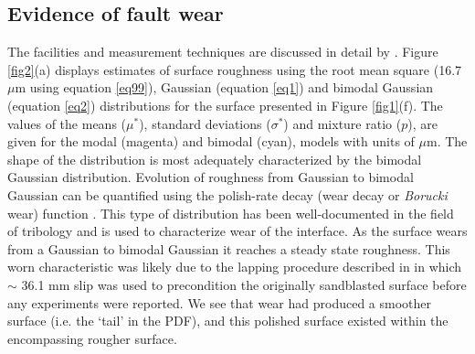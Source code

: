 \documentclass[preprint,1p, 10pt,authoryear]{elsarticle}
\begin{document}
\subsection{Evidence of fault wear}
\label{SurfaceWear}
The facilities and measurement techniques are discussed in detail by \citet{Selvadurai2017}.  Figure \ref{fig2}(a) displays estimates of surface roughness using the root mean square (16.7 $\mu$m using equation \eqref{eq99}), Gaussian (equation \eqref{eq1}) and bimodal Gaussian (equation \eqref{eq2}) distributions for the surface presented in Figure \ref{fig1}(f). The values of the means ($\mu^{*}$), standard deviations ($\sigma^{*}$) and mixture ratio ($p$), are given for the modal (magenta) and bimodal (cyan), models with units of $\mu$m. The shape of the distribution is most adequately characterized by the bimodal Gaussian distribution.  Evolution of roughness from Gaussian to bimodal Gaussian can be quantified using the polish-rate decay (wear decay or \textit{Borucki} wear) function \citep{Adachi2000, Borucki2002, Borucki2004, Ciavarella2016,He2017,Hu2019}. This type of distribution has been well-documented in the field of tribology and is used to characterize wear of the interface. As the surface wears from a Gaussian to bimodal Gaussian it reaches a steady state roughness.  This worn characteristic was likely due to the lapping procedure described in \citet{Selvadurai2015} in which  $\sim$ 36.1 mm slip was used to precondition the originally sandblasted surface before any experiments were reported. We see that wear had produced a smoother surface (i.e.  the `tail' in the PDF), and this polished surface existed within the encompassing rougher surface.     
\end{document}
